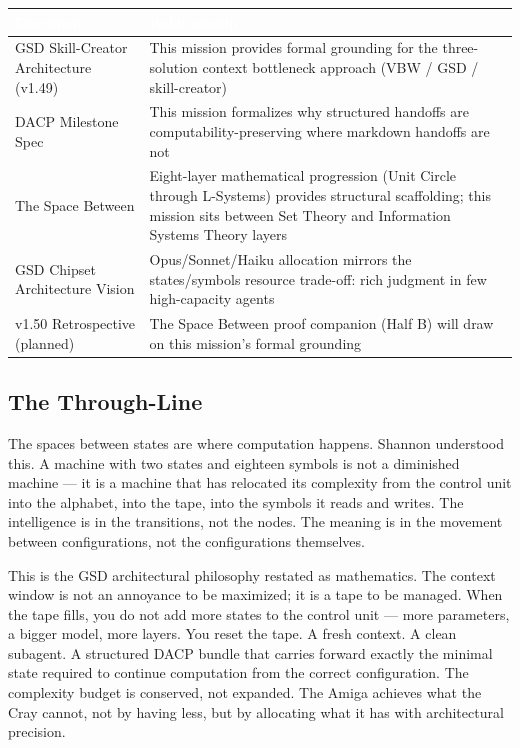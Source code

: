 \documentclass[11pt,letterpaper]{article}
\newcommand{\tableheader}[1]{\textbf{\sffamily\textcolor{white}{#1}}}
\begin{document}
\begin{center}
\begin{tabularx}{\textwidth}{L{4.5cm}X}
\toprule
{}
\tableheader{Document} & \tableheader{Relationship} \\
\midrule
GSD Skill-Creator Architecture (v1.49) & This mission provides formal grounding for the three-solution context bottleneck approach (VBW / GSD / skill-creator) \\
DACP Milestone Spec & This mission formalizes why structured handoffs are computability-preserving where markdown handoffs are not \\
The Space Between & Eight-layer mathematical progression (Unit Circle through L-Systems) provides structural scaffolding; this mission sits between Set Theory and Information Systems Theory layers \\
GSD Chipset Architecture Vision & Opus/Sonnet/Haiku allocation mirrors the states/symbols resource trade-off: rich judgment in few high-capacity agents \\
v1.50 Retrospective (planned) & The Space Between proof companion (Half B) will draw on this mission's formal grounding \\
\bottomrule
\end{tabularx}
\end{center}

\subsection{The Through-Line}

The spaces between states are where computation happens. Shannon understood this. A machine with two states and eighteen symbols is not a diminished machine --- it is a machine that has relocated its complexity from the control unit into the alphabet, into the tape, into the symbols it reads and writes. The intelligence is in the transitions, not the nodes. The meaning is in the movement between configurations, not the configurations themselves.

This is the GSD architectural philosophy restated as mathematics. The context window is not an annoyance to be maximized; it is a tape to be managed. When the tape fills, you do not add more states to the control unit --- more parameters, a bigger model, more layers. You reset the tape. A fresh context. A clean subagent. A structured DACP bundle that carries forward exactly the minimal state required to continue computation from the correct configuration. The complexity budget is conserved, not expanded. The Amiga achieves what the Cray cannot, not by having less, but by allocating what it has with architectural precision.
\end{document}
